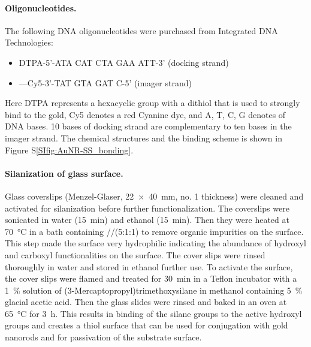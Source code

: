 \paragraph*{Oligonucleotides.} The following DNA oligonucleotides were purchased from Integrated DNA Technologies:
\begin{itemize}
	\item DTPA-5'-ATA CAT CTA GAA ATT-3' (docking strand)
	\item ---Cy5-3'-TAT GTA GAT C-5' (imager strand)
\end{itemize}
Here DTPA represents a hexacyclic group with a dithiol that is used to strongly bind to the gold, Cy5 denotes a red Cyanine dye, and A, T, C, G denotes of DNA bases. 10 bases of docking strand are complementary to ten bases in the imager strand. The chemical structures and the binding scheme is shown in Figure S\ref{SIfig:AuNR-SS_bonding}.


\paragraph*{Silanization of glass surface.} Glass coverslips (Menzel-Glaser, \SI[product-units=repeat]{22x40}{\mm}, no. 1 thickness) were cleaned and activated for silanization before further functionalization.
The coverslips were sonicated in water (\SI{15}{\minute}) and ethanol (\SI{15}{\minute}). 
Then they were heated  at \SI{70}{\celsius} in a bath containing //(5:1:1) to remove organic impurities on the surface.
This step made the surface very hydrophilic indicating the abundance of hydroxyl and carboxyl functionalities on the surface.
The cover slips were rinsed thoroughly in water and stored in ethanol further use.
To activate the surface, the cover slips were flamed and treated for 30~min in a Teflon incubator with a \SI{1}{\percent} solution of (3-Mercaptopropyl)trimethoxysilane in methanol containing \SI{5}{\percent} glacial acetic acid.
Then the glass slides were rinsed and baked in an oven at \SI{65}{\celsius} for \SI{3}{\hour}.
This results in binding of the silane groups to the active hydroxyl groups and creates a thiol surface that can be used for conjugation with gold nanorods and for passivation of the substrate surface.



